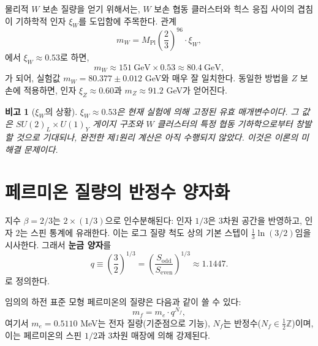 \documentclass[12pt,a4paper]{article}
\newtheorem{remark}[theorem]{비고}
\begin{document}
	물리적 \(W\) 보손 질량을 얻기 위해서는, \(W\) 보손 협동 클러스터와 힉스 응집 사이의 겹침이 기하학적 인자 \(\xi_W\)를 도입함에 주목한다. 관계
	\begin{equation}
		m_W = M_{\mathrm{Pl}} \left(\frac{2}{3}\right)^{96} \cdot \xi_W,
		\label{eq:mw}
	\end{equation}
	에서 \(\xi_W \approx 0.53\)로 하면,
	\begin{equation}
		m_W \approx 151\ \mathrm{GeV} \times 0.53 \approx 80.4\ \mathrm{GeV},
	\end{equation}
	가 되어, 실험값 \(m_W = 80.377 \pm 0.012\) GeV와 매우 잘 일치한다. 동일한 방법을 \(Z\) 보손에 적용하면, 인자 \(\xi_Z \approx 0.60\)과 \(m_Z \approx 91.2\) GeV가 얻어진다.
	
	\begin{remark}[\(\xi_W\)의 상황]
		\(\xi_W \approx 0.53\)은 현재 실험에 의해 고정된 유효 매개변수이다. 그 값은 \(SU(2)_L \times U(1)_Y\) 게이지 구조와 \(W\) 클러스터의 특정 협동 기하학으로부터 창발할 것으로 기대되나, 완전한 제1원리 계산은 아직 수행되지 않았다. 이것은 이론의 미해결 문제이다.
	\end{remark}
	
	\section{페르미온 질량의 반정수 양자화}
	
	지수 \(\beta = 2/3\)는 \(2 \times (1/3)\)으로 인수분해된다: 인자 \(1/3\)은 3차원 공간을 반영하고, 인자 \(2\)는 스핀 통계에 유래한다. 이는 로그 질량 척도 상의 기본 스텝이 \(\frac{1}{3}\ln(3/2)\)임을 시사한다. 그래서 \textbf{눈금 양자}를
	\begin{equation}
		q \equiv \left(\frac{3}{2}\right)^{1/3} = \left(\frac{S_{\mathrm{odd}}}{S_{\mathrm{even}}}\right)^{1/3} \approx 1.1447.
	\end{equation}
	로 정의한다.
	
	임의의 하전 표준 모형 페르미온의 질량은 다음과 같이 쓸 수 있다:
	\begin{equation}
		\boxed{m_f = m_e \cdot q^{N_f}},
		\label{eq:mass-quantization}
	\end{equation}
	여기서 \(m_e = 0.5110\) MeV는 전자 질량(기준점으로 기능), \(N_f\)는 반정수(\(N_f \in \frac{1}{2}\mathbb{Z}\))이며, 이는 페르미온의 스핀 \(1/2\)과 3차원 매장에 의해 강제된다.
	
\end{document}
